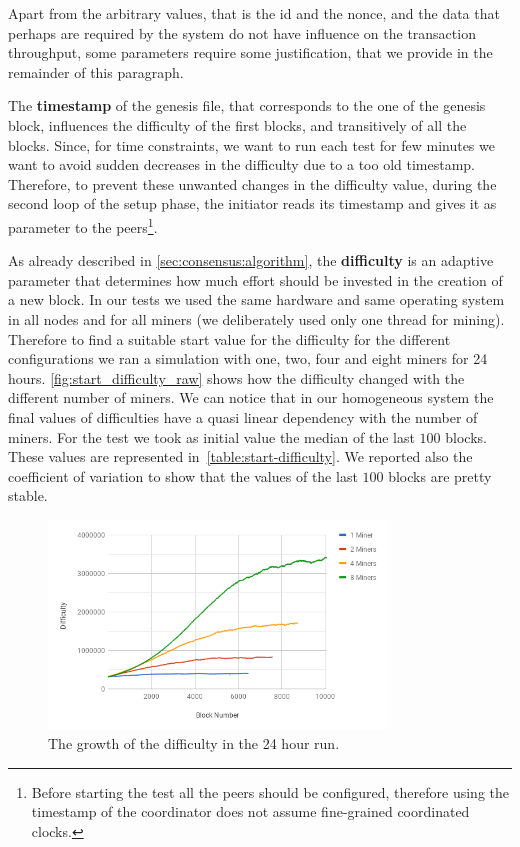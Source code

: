 \begin{figure}[H]
    
\end{figure}


Apart from the arbitrary values, that is the id and the nonce, and the data
that perhaps are required by the system do not have influence on the transaction
throughput, some parameters require some justification, that we provide in the 
remainder of this paragraph.

The \textbf{timestamp} of the genesis file, that corresponds to the one of the
genesis block, influences the difficulty of the first blocks, and transitively
of all the blocks. Since, for time constraints, we want to run each test for few
minutes we want to avoid sudden decreases in the difficulty due to a too old
timestamp. Therefore, to prevent these unwanted changes in the difficulty value,
during the second loop of the setup phase, the initiator reads its timestamp and
gives it as parameter to the peers\footnote{Before starting the test all the
peers should be configured, therefore using the timestamp of the coordinator
does not assume fine-grained coordinated clocks.}.

As already described in \autoref{sec:consensus:algorithm}, the
\textbf{difficulty} is an adaptive parameter that determines how much effort
should be invested in the creation of a new block. In our tests we used the same
hardware and same operating system in all nodes and for all miners (we
deliberately used only one thread for mining). Therefore to find a suitable
start value for the difficulty for the different configurations we ran a
simulation with one, two, four and eight miners for 24 hours.
\autoref{fig:start_difficulty_raw} shows how the difficulty changed with the
different number of miners. We can notice that in our homogeneous system the
final values of difficulties have a quasi linear dependency with the number of
miners. For the test we took as initial value the median of the last $100$
blocks. These values are represented in~\autoref{table:start-difficulty}. We
reported also the coefficient of variation to show that the values of the last
$100$ blocks are pretty stable.
\begin{figure}
  \begin{center}
    \includegraphics[width=0.8\textwidth]{./res/img/start_difficulty_all.png}
    \caption{The growth of the difficulty in the 24 hour run.}
    \label{fig:start_difficulty_raw}
  \end{center}
\end{figure}

